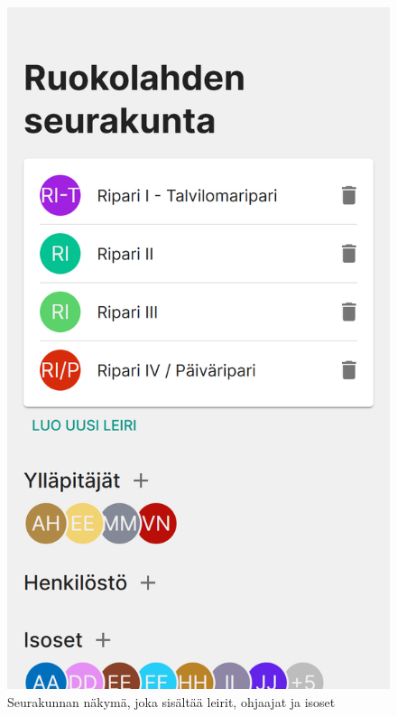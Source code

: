 \begin{figure}[h!]
    \centering
    \begin{minipage}[b]{.3\textwidth}
        \includegraphics[width=\textwidth]{figures/isosapp-leirit.png}
        \caption{Seurakunnan näkymä, joka sisältää leirit, ohjaajat ja isoset}
        \label{fig:isosapp-leirit}
    \end{minipage}\qquad
    \begin{minipage}[b]{.3\textwidth}

\end{minipage}
\end{figure}
